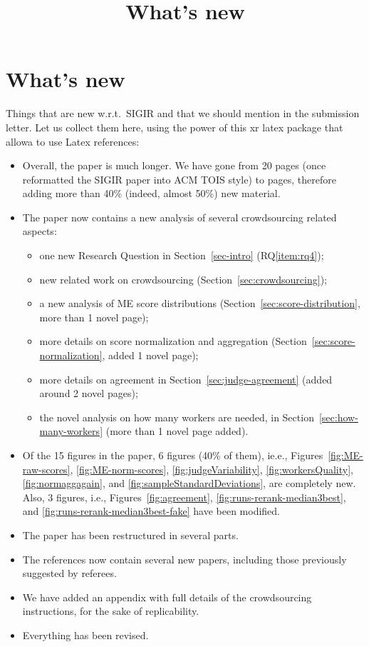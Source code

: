 \documentclass{article}
\title{What's new}
\begin{document}
\maketitle

\section*{What's new}

Things that are new w.r.t.\ SIGIR and that we should mention in the
submission letter. 
Let us collect them here, using the power of this xr latex package
that allowa to use Latex references:

\begin{itemize}

\item Overall, the paper is much longer. We have gone from 20 pages
  (once reformatted the SIGIR paper into ACM TOIS style)  to \pageref{sec:task-steps} 
pages, therefore adding more than 40\% (indeed, almost 50\%) new material.
\item The paper now contains a new analysis of several crowdsourcing
  related aspects:
  \begin{itemize}
  \item one new Research Question in Section~\ref{sec-intro} (RQ\ref{item:rq4});
  \item new related work on crowdsourcing (Section~\ref{sec:crowdsourcing});
  \item a new analysis of ME score distributions
    (Section~\ref{sec:score-distribution}, more than 1 novel page);
  \item more details on score normalization and aggregation
    (Section~\ref{sec:score-normalization}, added 1 novel page);
  \item more details on agreement in Section~\ref{sec:judge-agreement}
    (added around 2 novel pages);
  \item the novel analysis on how many workers are needed, in
    Section~\ref{sec:how-many-workers} (more than 1 novel page added).
  \end{itemize}
\item Of the 15 figures in the paper, 6 figures (40\% of them), ie.e., Figures~\ref{fig:ME-raw-scores}, \ref{fig:ME-norm-scores},
  \ref{fig:judgeVariability}, \ref{fig:workersQuality},
  \ref{fig:normaggagain}, and \ref{fig:sampleStandardDeviations}, are
  completely new. Also, 3 figures, i.e., Figures~\ref{fig:agreement},
  \ref{fig:runs-rerank-median3best}, and \ref{fig:runs-rerank-median3best-fake} have been modified.
\item The paper has been restructured in several parts.
\item The references now contain  several new papers, including those previously suggested by referees.
\item We have added an appendix with full details of the crowdsourcing
  instructions, for the sake of replicability. 
\item Everything has been revised.
 
\end{itemize}
\end{document}
